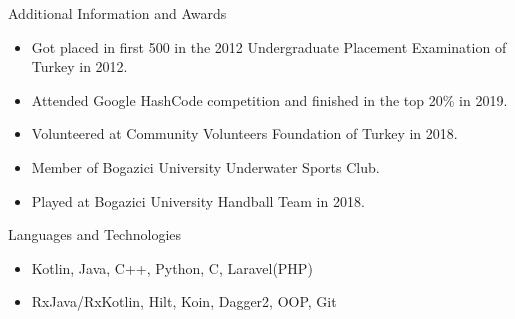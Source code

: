 \documentclass[]{mcdowellcv}
\begin{document}
	\begin{cvsection}{Additional Information and Awards}
		\begin{cvsubsection}{}{}{}	
			\begin{itemize}
				\item Got placed in first 500 in the 2012 Undergraduate Placement Examination of Turkey in 2012.
                \item Attended Google HashCode competition and finished in the top 20\% in 2019.
			    \item Volunteered at Community Volunteers Foundation of Turkey in 2018.
			    \item Member of Bogazici University Underwater Sports Club.
			    \item Played at Bogazici University Handball Team in 2018.
			\end{itemize}
		\end{cvsubsection}
	\end{cvsection}
	
	\begin{cvsection}{Languages and Technologies}
		\begin{cvsubsection}{}{}{}	
			\begin{itemize}
				\item Kotlin, Java, C++, Python, C, Laravel(PHP)
				\item RxJava/RxKotlin, Hilt, Koin, Dagger2, OOP, Git
			\end{itemize}
		\end{cvsubsection}
	\end{cvsection}
	
\end{document}
